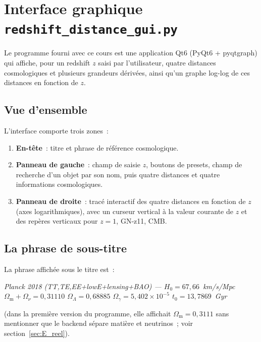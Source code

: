 \documentclass[11pt,a4paper,openany]{report}
\newcommand{\Hzero}{H_{0}}
\newcommand{\Om}{\Omega_{\mathrm{m}}}
\newcommand{\OL}{\Omega_{\Lambda}}
\begin{document}
\chapter{Interface graphique \texttt{redshift\_distance\_gui.py}}
\label{chap:gui}

Le programme fourni avec ce cours est une application Qt6 (PyQt6 + pyqtgraph)
qui affiche, pour un redshift $z$ saisi par l'utilisateur, quatre distances
cosmologiques et plusieurs grandeurs dérivées, ainsi qu'un graphe log-log de
ces distances en fonction de $z$.

\section{Vue d'ensemble}

L'interface comporte trois zones~:

\begin{enumerate}[topsep=2pt]
\item \textbf{En-tête}~: titre et phrase de référence cosmologique.
\item \textbf{Panneau de gauche}~: champ de saisie $z$, boutons de presets,
champ de recherche d'un objet par son nom, puis quatre distances et quatre
informations cosmologiques.
\item \textbf{Panneau de droite}~: tracé interactif des quatre distances
en fonction de $z$ (axes logarithmiques), avec un curseur vertical à la valeur
courante de $z$ et des repères verticaux pour $z=1$, GN-z11, CMB.
\end{enumerate}

\section{La phrase de sous-titre}
\label{sec:sous_titre}

La phrase affichée sous le titre est~:

\begin{center}\itshape
Planck 2018 (TT,TE,EE+lowE+lensing+BAO) --- $\Hzero=67{,}66$~km/s/Mpc \quad
$\Om+\Omega_{\nu} = 0{,}31110$ \quad $\OL = 0{,}68885$ \quad
$\Omega_{\gamma} = 5{,}402\times10^{-5}$ \quad $t_{0} = 13{,}7869$~Gyr
\end{center}

\noindent (dans la première version du programme, elle affichait
$\Om = 0{,}3111$ sans mentionner que le backend sépare matière et neutrinos~;
voir section~\ref{sec:E_reel}).
\end{document}
